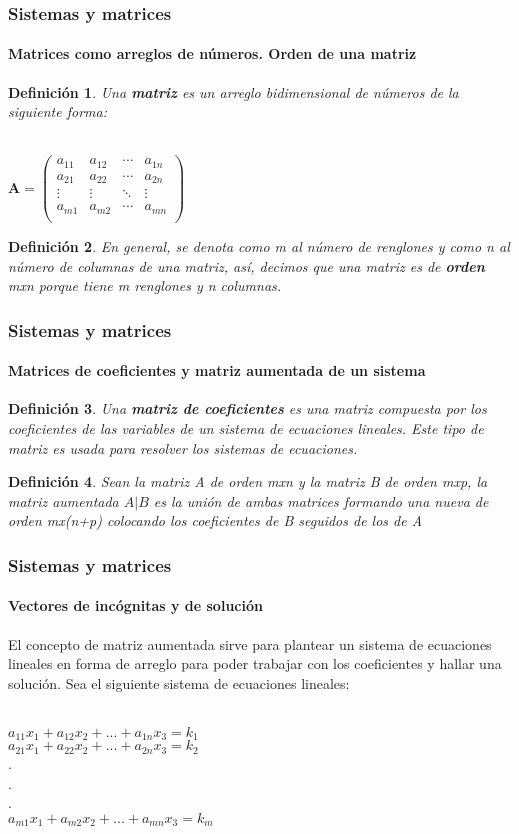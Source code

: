 \documentclass[11pt]{beamer}
\newtheorem{defi}{Definición}
\begin{document}
\begin{frame}
\frametitle{Sistemas y matrices}
\framesubtitle{Matrices como arreglos de números. Orden de una matriz}
\begin{defi}
Una \textbf{matriz} es un arreglo bidimensional de números de la siguiente forma:\\ \hspace{0cm} \\
\begin{center}
${\displaystyle \mathbf {A} ={\begin{pmatrix}a_{11}&a_{12}&\cdots &a_{1n}\\a_{21}&a_{22}&\cdots &a_{2n}\\\vdots &\vdots &\ddots &\vdots \\a_{m1}&a_{m2}&\cdots &a_{mn}\\\end{pmatrix}}}$
\end{center}
\end{defi}
\begin{defi}
En general, se denota como m al número de renglones y como n al número de columnas de una matriz, así, decimos que una matriz es de \textbf{orden} mxn porque tiene m renglones y n columnas.
\end{defi}
\end{frame}

\begin{frame}
\frametitle{Sistemas y matrices}
\framesubtitle{Matrices de coeficientes y matriz aumentada de un sistema}
\begin{defi}
Una \textbf{matriz de coeficientes} es una matriz compuesta por los coeficientes de las variables de un sistema de ecuaciones lineales. Este tipo de matriz es usada para resolver los sistemas de ecuaciones.
\end{defi}
\begin{defi}
Sean la matriz A de orden mxn y la matriz B de orden mxp, la matriz aumentada $A|B$ es la unión de ambas matrices formando una nueva de orden mx(n+p) colocando los coeficientes de B seguidos de los de A
\end{defi}
\end{frame}

\begin{frame}
\frametitle{Sistemas y matrices}
\framesubtitle{Vectores de incógnitas y de solución}
El concepto de matriz aumentada sirve para plantear un sistema de ecuaciones lineales en forma de arreglo para poder trabajar con los coeficientes y hallar una solución. Sea el siguiente sistema de ecuaciones lineales: \\ \hspace{0cm} \\
\begin{center}
$a_{11}x_1 + a_{12}x_2 + ... + a_{1n}x_3 = k_1$\\
$a_{21}x_1 + a_{22}x_2 + ... + a_{2n}x_3 = k_2$\\
.\\
.\\
.\\
$a_{m1}x_1 + a_{m2}x_2 + ... + a_{mn}x_3 = k_m$\\
\end{center}
\end{frame}
\end{document}
